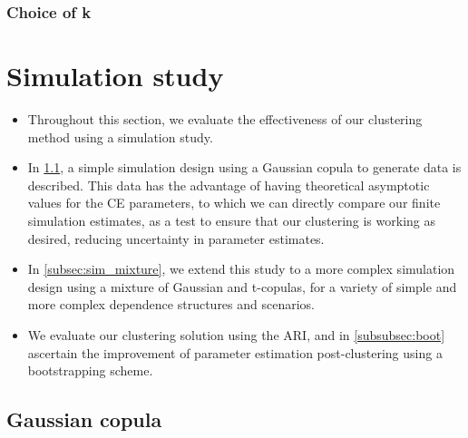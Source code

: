 \documentclass{article}
\numberwithin{equation}{section}
\begin{document}
\subsubsection{Choice of k}


\section{Simulation study}\label{sec:sim}

\begin{itemize}
  \item Throughout this section, we evaluate the effectiveness of our clustering method using a simulation study.
  \item In \ref{subsec:sim_gauss}, a simple simulation design using a Gaussian copula to generate data is described. 
  This data has the advantage of having theoretical asymptotic values for the CE parameters, to which we can directly compare our finite simulation estimates, as a test to ensure that our clustering is working as desired, reducing uncertainty in parameter estimates. 
  \item In \ref{subsec:sim_mixture}, we extend this study to a more complex simulation design using a mixture of Gaussian and t-copulas, for a variety of simple and more complex dependence structures and scenarios. 
  \item We evaluate our clustering solution using the ARI, and in \ref{subsubsec:boot} ascertain the improvement of parameter estimation post-clustering using a bootstrapping scheme. 
\end{itemize}

\subsection{Gaussian copula} \label{subsec:sim_gauss}
\end{document}
